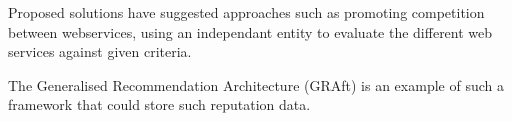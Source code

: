 Proposed solutions have suggested approaches such as promoting competition between webservices, using an independant entity to evaluate the different web services against given criteria. %

The Generalised Recommendation Architecture (GRAft) is an example of such a framework that could store such reputation data.




